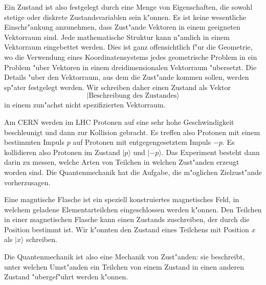 Ein Zustand ist also festgelegt durch eine Menge von Eigenschaften,
die sowohl stetige oder diskrete Zustandsvariablen sein k"onnen.
Es ist keine wesentliche Einschr"ankung anzunehmen, dass Zust"ande
Vektoren in einem geeigneten Vektorraum sind.
Jede mathematische Struktur kann n"amlich in einem Vektorraum eingebettet
werden. Dies ist ganz offensichtlich f"ur die Geometrie, wo die Verwendung
eines Koordinatensystems jedes geometrische Problem in ein Problem "uber
Vektoren in einem dreidimensionalen Vektorraum "ubersetzt. Die Details "uber den
Vektorraum, aus dem die Zust"ande kommen sollen, werden sp"ater festgelegt
werden. Wir schreiben daher einen Zustand als Vektor
\[
|\text{Beschreibung des Zustandes}\rangle
\]
in einem zun"achst nicht spezifizierten Vektorraum.

Am CERN werden im LHC Protonen auf eine sehr hohe Geschwindigkeit 
beschleunigt und dann zur Kollision gebracht. Es treffen also
Protonen mit einem bestimmten Impuls $p$ auf Protonen mit entgegengesetztem
Impuls $-p$. Es kollidieren also Protonen im Zustand $|p\rangle$ und
$|\text{$-p$}\rangle$. Das Experiment besteht dann darin zu messen, welche Arten von
Teilchen in welchen Zust"anden erzeugt worden sind.
Die Quantenmechanik hat
die Aufgabe, die m"oglichen Zielzust"ande vorherzusagen.

Eine magntische Flasche ist ein speziell konstruiertes magnetisches Feld,
in welchem geladene Elementarteilchen eingeschlossen werden k"onnen.
Den Teilchen in einer magnetischen Flasche kann einen Zustands zuschreiben,
der durch die Position bestimmt ist.
Wir k"onnten den Zustand eines Teilchens mit Position $x$ als $|x\rangle$
schreiben.

Die Quantenmechanik ist also eine Mechanik von Zust"anden: sie beschreibt,
unter welchen Umst"anden ein Teilchen von einem Zustand in einen anderen
Zustand "ubergef"uhrt werden k"onnen. 

